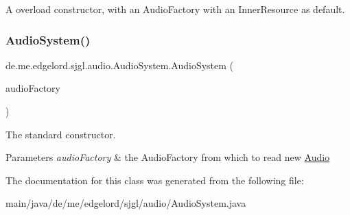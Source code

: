 A overload constructor, with an {\ttfamily Audio\+Factory} with an {\ttfamily Inner\+Resource} as default. \mbox{\label{classde_1_1me_1_1edgelord_1_1sjgl_1_1audio_1_1_audio_system_a332604b3b6fce17335bf6180ba15dd9b}} 
\subsubsection{\texorpdfstring{Audio\+System()}{AudioSystem()}\hspace{0.1cm}{\footnotesize\ttfamily [2/2]}}
{\footnotesize\ttfamily de.\+me.\+edgelord.\+sjgl.\+audio.\+Audio\+System.\+Audio\+System (\begin{DoxyParamCaption}\item[{\mbox{\hyperlink{classde_1_1me_1_1edgelord_1_1sjgl_1_1factory_1_1_audio_factory}{Audio\+Factory}}}]{audio\+Factory }\end{DoxyParamCaption})}

The standard constructor.


\begin{DoxyParams}{Parameters}
{\em audio\+Factory} & the {\ttfamily Audio\+Factory} from which to read new {\ttfamily \mbox{\hyperlink{classde_1_1me_1_1edgelord_1_1sjgl_1_1audio_1_1_audio}{Audio}}} \\
\hline
\end{DoxyParams}


The documentation for this class was generated from the following file\+:\begin{DoxyCompactItemize}
\item 
main/java/de/me/edgelord/sjgl/audio/Audio\+System.\+java\end{DoxyCompactItemize}
